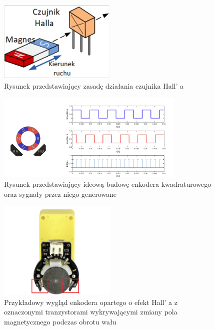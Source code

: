 \begin{figure}[h]
    \centering
    \includegraphics[width=0.5\textwidth]{./graf/halla-enc.jpg}
    \caption{Rysunek przedstawiający zasadę działania czujnika Hall' a \cite{bib:hall_net}}
    \label{rys2:encoders-graf}
\end{figure}

\begin{figure}[h]
    \centering
    \includegraphics[width=0.8\textwidth]{./graf/enkoders.png}
    \caption{Rysunek przedstawiający ideową budowę enkodera kwadraturowego oraz sygnały przez niego generowane \cite{bib:encoders-pid}}
    \label{rys2:encoders-graf}
\end{figure}

\begin{figure}[h]
    \centering
    \includegraphics[width=0.5\textwidth]{./graf/enkoder-silnik.png}
    \caption{Przykładowy wygląd enkodera opartego o efekt Hall' a z oznaczonymi tranzystorami wykrywającymi zmiany pola magnetycznego podczas obrotu wału \cite{bib:botland-hall}}
    \label{rys2:encoders-sample}
\end{figure}

